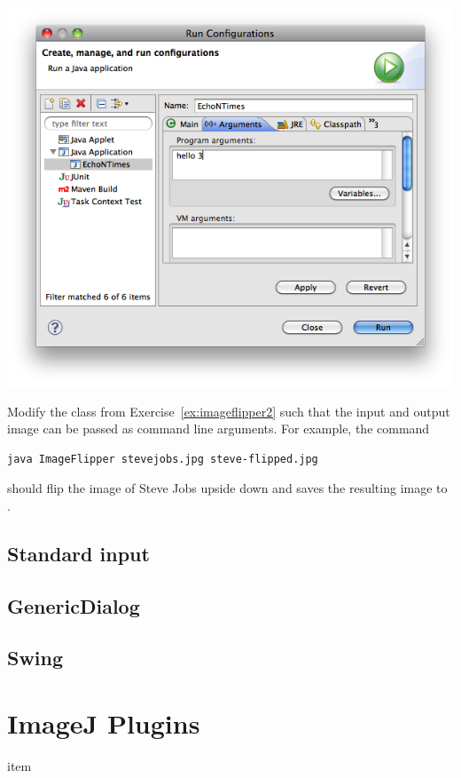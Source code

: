 \documentclass{book}
\begin{document}
\includegraphics[scale=0.5]{arguments-eclipse.png} 

\begin{exercise}\label{ex:imageflipper3}
Modify the class  from Exercise~\ref{ex:imageflipper2} such that the input and output image can be passed as command line arguments. For example, the command
\begin{verbatim}
java ImageFlipper stevejobs.jpg steve-flipped.jpg 
\end{verbatim}
should flip the image of Steve Jobs upside down and saves the resulting image to .
\end{exercise}

\subsection{Standard input}

\subsection{GenericDialog}

\subsection{Swing}



\section{ImageJ Plugins}


\begin{exercise}
  item
\end{exercise}
\end{document}
